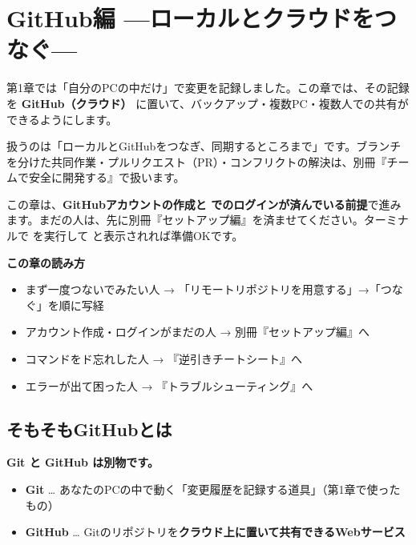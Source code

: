 \chapter{GitHub編 —ローカルとクラウドをつなぐ—}

第1章では「自分のPCの中だけ」で変更を記録しました。この章では、その記録を \textbf{GitHub（クラウド）} に置いて、バックアップ・複数PC・複数人での共有ができるようにします。

扱うのは「ローカルとGitHubをつなぎ、同期するところまで」です。ブランチを分けた共同作業・プルリクエスト（PR）・コンフリクトの解決は、別冊『チームで安全に開発する』で扱います。

\begin{warnbox}
この章は、\textbf{GitHubアカウントの作成と  でのログインが済んでいる前提}で進みます。まだの人は、先に別冊『セットアップ編』を済ませてください。ターミナルで  を実行して  と表示されれば準備OKです。
\end{warnbox}

\begin{hintbox}
\textbf{この章の読み方}
\begin{itemize}[leftmargin=1.4em, nosep]
  \item まず一度つないでみたい人 → 「リモートリポジトリを用意する」→「つなぐ」を順に写経
  \item アカウント作成・ログインがまだの人 → 別冊『セットアップ編』へ
  \item コマンドをド忘れした人 → 『逆引きチートシート』へ
  \item エラーが出て困った人 → 『トラブルシューティング』へ
\end{itemize}
\end{hintbox}

\section{そもそもGitHubとは}

\textbf{Git と GitHub は別物です。}

\begin{itemize}[leftmargin=1.4em]
  \item \textbf{Git} … あなたのPCの中で動く「変更履歴を記録する道具」（第1章で使ったもの）
  \item \textbf{GitHub} … Gitのリポジトリを\textbf{クラウド上に置いて共有できるWebサービス}
\end{itemize}

